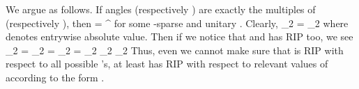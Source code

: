 We argue as follows.
If angles  (respectively ) are exactly the multiples of  (respectively ), then
 {
\NC {}
=\NC {}    ^\Adj \NR
}
for some -sparse  and unitary .
Clearly,
 {
\NC {} _2
\NC = _2 \NR
}
where  denotes entrywise absolute value.
Then if we notice that  and  has  RIP too, we see
 {
\NC \NC {} _2 \NR
%
\NC =\NC {} _2 \NR
%
\NC =\NC {} _2 \NR
%
\NC =\NC {} _2 \D
    _2 \NR
%
\NC \eqsim \NC {} _2  \NR
}
Thus, even we cannot make sure that  is  RIP with respect to all possible 's, at least  has RIP with respect to relevant values of  according to the form .

\stopsubsection

\stopsection
